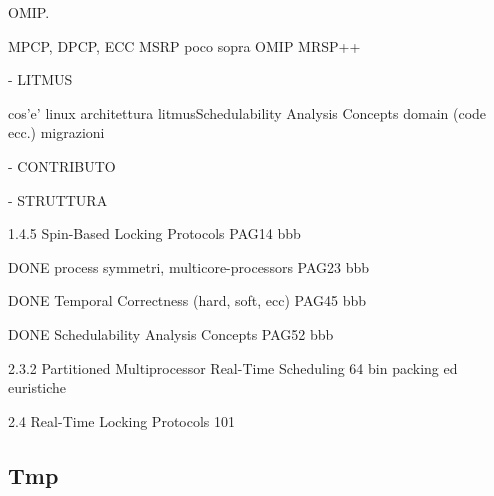OMIP. 






MPCP, DPCP, ECC
MSRP poco sopra
OMIP
MRSP++

- LITMUS

cos'e'
linux
architettura litmusSchedulability Analysis Concepts
domain (code ecc.)
migrazioni

- CONTRIBUTO

- STRUTTURA


1.4.5
Spin-Based Locking Protocols PAG14 bbb

DONE process symmetri, multicore-processors PAG23 bbb

DONE Temporal Correctness (hard, soft, ecc) PAG45 bbb

DONE Schedulability Analysis Concepts PAG52 bbb

2.3.2 Partitioned Multiprocessor Real-Time Scheduling 64
bin packing ed euristiche

2.4 Real-Time Locking Protocols 101

\subsection{Tmp}
\label{sec:introduzione_}